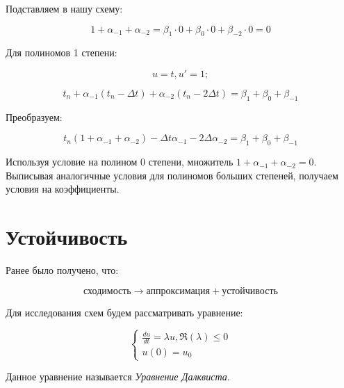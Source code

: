 \documentclass[10pt,a4paper]{article}
\begin{document}
		Подставляем в нашу схему:
		
		\begin{equation}
			1 + \alpha_{-1} + \alpha_{-2} = \beta_{1}\cdot 0 + \beta_{0}\cdot 0
			+ \beta_{-2}\cdot 0 = 0
		\end{equation}
		
		Для полиномов 1 степени:		
		
		\begin{equation}
			u = t, u' = 1;
		\end{equation}
		
		\begin{equation}
			t_{n} + \alpha_{-1}\left(t_{n} - \Delta t\right) + \alpha_{-2}
			\left(t_{n} - 2\Delta t\right) = \beta_{1} + \beta_{0} + \beta_{-1}
		\end{equation}
		
		Преобразуем:
		
		\begin{equation}
			t_{n}\left(1 + \alpha_{-1} + \alpha_{-2}\right) - \Delta t
			\alpha_{-1} - 2\Delta \alpha_{-2} = \beta_{1} + \beta_{0} + 
			\beta_{-1}
		\end{equation}
		
		Используя условие на полином 0 степени, множитель $1 + \alpha_{-1} + 
		\alpha_{-2} = 0$. Выписывая аналогичные условия для полиномов больших 
		степеней, получаем условия на коэффициенты.
		
		\section{Устойчивость}
		
		Ранее было получено, что:
		
		\begin{equation}
			\text{сходимость} \rightarrow \text{аппроксимация} + 
			\text{устойчивость}
		\end{equation}
		
		Для исследования схем будем рассматривать уравнение:
		
		\begin{equation}
			\begin{cases}
				\frac{du}{dt} = \lambda u, \Re\left(\lambda\right) \leqslant 0
				\\
				u\left(0\right) = u_{0}
			\end{cases}
		\end{equation}
		
		Данное уравнение называется \textit{Уравнение Далквиста}.
		
\end{document}
